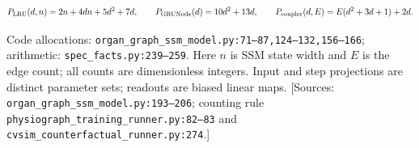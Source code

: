 \[
P_{\rm LRU}(d,n)=2n+4dn+5d^2+7d,\qquad
P_{\rm GRUNode}(d)=10d^2+13d,\qquad
P_{\rm coupler}(d,E)=E(d^2+3d+1)+2d.
\]


Code allocations: \texttt{organ\_\allowbreak{}graph\_\allowbreak{}ssm\_\allowbreak{}model.\allowbreak{}py:\allowbreak{}71–\allowbreak{}87,\allowbreak{}124–\allowbreak{}132,\allowbreak{}156–\allowbreak{}166}; arithmetic: \texttt{spec\_\allowbreak{}facts.\allowbreak{}py:\allowbreak{}239–\allowbreak{}259}. Here \(n\) is SSM state width and \(E\) is the edge count; all counts are dimensionless integers. Input and step projections are distinct parameter sets; readouts are biased linear maps. [Sources: \texttt{organ\_\allowbreak{}graph\_\allowbreak{}ssm\_\allowbreak{}model.\allowbreak{}py:\allowbreak{}193–\allowbreak{}206}; counting rule \texttt{physiograph\_\allowbreak{}training\_\allowbreak{}runner.\allowbreak{}py:\allowbreak{}82–\allowbreak{}83} and \texttt{cvsim\_\allowbreak{}counterfactual\_\allowbreak{}runner.\allowbreak{}py:\allowbreak{}274}.]

\begin{center}
\small
{}
\ifdim\wd0>\textwidth\resizebox{\textwidth}{!}{\usebox0}\else\usebox0\fi
\end{center}


